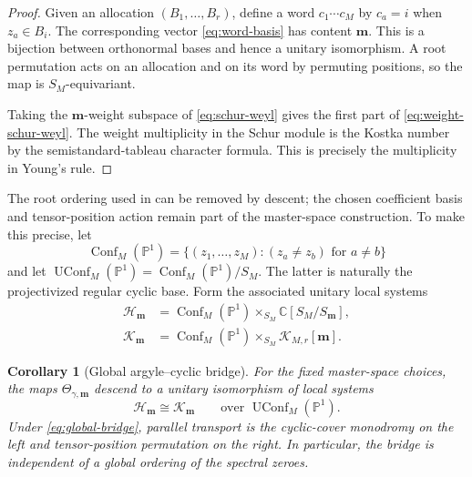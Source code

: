 \documentclass[11pt]{article}
\newtheorem{corollary}[theorem]{Corollary}
\theoremstyle{definition}
\theoremstyle{remark}
\newcommand{\C}{\mathbb C}
\newcommand{\Pp}{\mathbb P}
\newcommand{\cK}{\mathcal K}
\begin{document}
\begin{proof}
Given an allocation $(B_1,\ldots,B_r)$, define a word $c_1\cdots c_M$ by $c_a=i$ when $z_a\in B_i$.  The corresponding vector \eqref{eq:word-basis} has content $\boldsymbol m$.  This is a bijection between orthonormal bases and hence a unitary isomorphism.  A root permutation acts on an allocation and on its word by permuting positions, so the map is $S_M$-equivariant.

Taking the $\boldsymbol m$-weight subspace of \eqref{eq:schur-weyl} gives the first part of \eqref{eq:weight-schur-weyl}.  The weight multiplicity in the Schur module is the Kostka number by the semistandard-tableau character formula.  This is precisely the multiplicity in Young's rule.
\end{proof}

The root ordering used in  can be removed by descent; the chosen coefficient basis and tensor-position action remain part of the master-space construction.  To make this precise, let
\[
 \operatorname{Conf}_M(\Pp^1)
 =\{(z_1,\ldots,z_M):(z_a\neq z_b)\text{ for }a\neq b\}
\]
and let $\operatorname{UConf}_M(\Pp^1)=\operatorname{Conf}_M(\Pp^1)/S_M$.  The latter is naturally the projectivized regular cyclic base.  Form the associated unitary local systems
\begin{align}
 \mathscr H_{\boldsymbol m}
 &=\operatorname{Conf}_M(\Pp^1)
   \times_{S_M}\C[S_M/S_{\boldsymbol m}],
   \label{eq:cyclic-local-system}\\
 \mathscr K_{\boldsymbol m}
 &=\operatorname{Conf}_M(\Pp^1)
   \times_{S_M}\cK_{M,r}[\boldsymbol m].
   \label{eq:argyle-local-system}
\end{align}

\begin{corollary}[Global argyle--cyclic bridge]\label{cor:global-bridge}
For the fixed master-space choices, the maps $\Theta_{\gamma,\boldsymbol m}$ descend to a unitary isomorphism of local systems
\begin{equation}\label{eq:global-bridge}
 \mathscr H_{\boldsymbol m}\cong\mathscr K_{\boldsymbol m}
 \qquad\text{over }\operatorname{UConf}_M(\Pp^1).
\end{equation}
Under \eqref{eq:global-bridge}, parallel transport is the cyclic-cover monodromy on the left and tensor-position permutation on the right.  In particular, the bridge is independent of a global ordering of the spectral zeroes.
\end{corollary}
\end{document}
